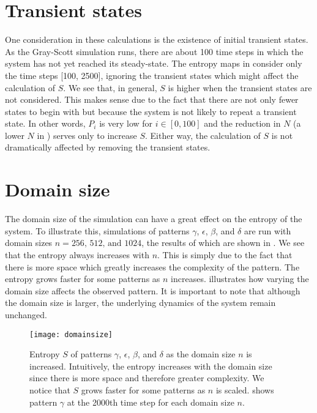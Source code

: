 \section{Transient states}

One consideration in these calculations is the existence of initial transient states. As the Gray-Scott simulation runs, there are about 100 time steps in which the system has not yet reached its steady-state. The entropy maps in  consider only the time steps [100, 2500], ignoring the transient states which might affect the calculation of $S$. We see that, in general, $S$ is higher when the transient states are not considered. This makes sense due to the fact that there are not only fewer states to begin with but because the system is not likely to repeat a transient state. In other words, $P_i$ is very low for $i \in [0, 100]$ and the reduction in $N$ (a lower $N$ in ) serves only to increase $S$. Either way, the calculation of $S$ is not dramatically affected by removing the transient states.

\section{Domain size}

The domain size of the simulation can have a great effect on the entropy of the system. To illustrate this, simulations of patterns $\gamma$, $\epsilon$, $\beta$, and $\delta$ are run with domain sizes $n = 256,\, 512,\, \text{and } 1024$, the results of which are shown in . We see that the entropy always increases with $n$. This is simply due to the fact that there is more space which greatly increases the complexity of the pattern. The entropy grows faster for some patterns as $n$ increases.   illustrates how varying the domain size affects the observed pattern. It is important to note that although the domain size is larger, the underlying dynamics of the system remain unchanged.
%
\begin{figure}[h]
	\centering
	\texttt{[image: domainsize]}
	\caption{Entropy $S$ of patterns $\gamma$, $\epsilon$, $\beta$, and $\delta$ as the domain size $n$ is increased. Intuitively, the entropy increases with the domain size since there is more space and therefore greater complexity. We notice that $S$ grows faster for some patterns as $n$ is scaled.  shows pattern $\gamma$ at the 2000th time step for each domain size $n$.}
	\label{fig:domainsize}
\end{figure}


